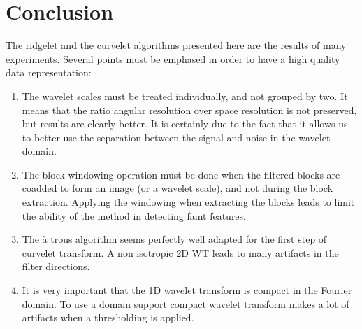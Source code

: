 \documentclass{article}
\begin{document}
\section{Conclusion}
The ridgelet and the curvelet algorithms presented here are the results of many 
experiments. Several points must be emphased in order to
have a high quality data representation:
\begin{enumerate}
\item The wavelet scales must be treated individually, and not grouped
by two. It means that the ratio angular resolution over space resolution
is not preserved, but results are clearly better. It is certainly due
to the fact that it allows us to better use  the separation 
between the signal and  noise in the wavelet domain.
\item The block windowing operation must be done when the filtered blocks 
are coadded to form an image (or a wavelet scale), and not 
during the block extraction. Applying the windowing when extracting the blocks
leads to limit the ability of the method in detecting faint features.
\item The \`a trous algorithm seems perfectly well adapted for the first step
of curvelet transform. A non isotropic 2D WT leads to many artifacts
in the filter directions.
\item It is very important that the 1D wavelet transform is compact in
the Fourier domain. To use a domain support compact wavelet transform
makes a lot of artifacts when a thresholding is applied. 
\end{enumerate}




\end{document}
